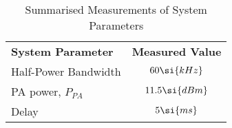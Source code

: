 \begin{table}[htbp]
  \centering
  \caption{Summarised Measurements of System Parameters}
    \begin{tabular}{lc}
    \rowcolor[rgb]{ 0,  0,  0} \textcolor[rgb]{ 1,  1,  1}{\textbf{System Parameter}}	& \textcolor[rgb]{ 1,  1,  1}{\textbf{Measured Value}} 		\\
    	Half-Power Bandwidth										& $\measBW\si{kHz}$ 					\\
    	PA power, $P_{PA}$ 											& $\measPWR \si{dBm}$ 					\\
    	Delay 													& $\measDelay \si{ms}$ 					\\
 \end{tabular}
  \label{tab:meas_specs}
\end{table}